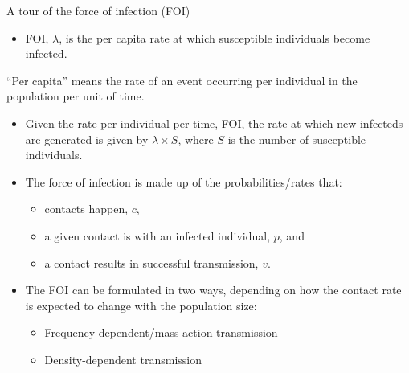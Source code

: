 \documentclass[
  ignorenonframetext,
]{beamer}
\providecommand{\tightlist}{%
  \setlength{\itemsep}{0pt}\setlength{\parskip}{0pt}}\usepackage{longtable,booktabs,array}
\begin{document}
\begin{frame}
\begin{block}{A tour of the force of infection (FOI)}
\label{a-tour-of-the-force-of-infection-foi}
\begin{itemize}
\tightlist
\item
  FOI, \(\lambda\), is the {per capita rate} at which susceptible
  individuals become infected.
\end{itemize}

\begin{tcolorbox}[enhanced jigsaw, colframe=quarto-callout-note-color-frame, toprule=.15mm, opacitybacktitle=0.6, breakable, colback=white, leftrule=.75mm, left=2mm, opacityback=0, titlerule=0mm, bottomtitle=1mm, toptitle=1mm, title={Note}, bottomrule=.15mm, arc=.35mm, coltitle=black, colbacktitle=quarto-callout-note-color!10!white, rightrule=.15mm]

``Per capita'' means the rate of an event occurring per individual in
the population per unit of time.

\end{tcolorbox}

\begin{itemize}
\tightlist
\item
  Given the rate per individual per time, FOI, the rate at which new
  infecteds are generated is given by {\(\lambda \times S\)}, where
  \(S\) is the number of susceptible individuals.
\end{itemize}
\end{block}
\end{frame}

\begin{frame}
\begin{itemize}
\tightlist
\item
  The force of infection is made up of the probabilities/rates that:

  \begin{itemize}
  \tightlist
  \item
    contacts happen, {\(c\)},
  \item
    a given contact is with an infected individual, {\(p\)}, and
  \item
    a contact results in successful transmission, {\(v\)}.
  \end{itemize}
\end{itemize}
\end{frame}

\begin{frame}
\begin{itemize}
\tightlist
\item
  The FOI can be formulated in two ways, depending on how the contact
  rate is expected to change with the population size:

  \begin{itemize}
  \tightlist
  \item
    Frequency-dependent/mass action transmission
  \item
    Density-dependent transmission
  \end{itemize}
\end{itemize}
\end{frame}
\end{document}
